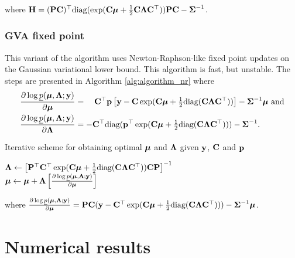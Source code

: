 \documentclass[times, doublespace]{anzsauth}
\begin{document}
	\noindent where ${\bf H} = ({\bf P} {\bf C})^\top \text{diag}(\exp({\bf C} {\boldsymbol \mu} + \tfrac{1}{2} {\bf C} {\boldsymbol \Lambda} {\bf C}^\top)) {\bf P} {\bf C} - {\boldsymbol \Sigma}^{-1}$.
	
	\subsubsection{GVA fixed point}
	
	
	This variant of the algorithm uses Newton-Raphson-like fixed point updates on the Gaussian variational lower
	bound. This algorithm is fast, but unstable. The steps are presented in Algorithm \ref{alg:algorithm_nr} where
	\begin{align*}
		\frac{\partial \log \underline{p}({\boldsymbol \mu}, {\boldsymbol \Lambda}; {\bf y})}{\partial {\boldsymbol\mu}}     & = \quad {\bf C}^\top{\bf p} \left [{\bf y} - {\bf C}\exp({\bf C} {\boldsymbol \mu} + \tfrac{1}{2} \text{diag}({\bf C} {\boldsymbol \Lambda} {\bf C}^\top)) \right ] - {\boldsymbol \Sigma}^{-1} {\boldsymbol \mu} \text{ and} \\
		\frac{\partial \log \underline{p}({\boldsymbol \mu}, {\boldsymbol \Lambda}; {\bf y})}{\partial {\boldsymbol\Lambda}} & = -{\bf C}^\top \text{diag}({\bf p}^\top \exp({\bf C} {\boldsymbol \mu} +\tfrac{1}{2} \text{diag}({\bf C} {\boldsymbol \Lambda} {\bf C}^\top))) - {\boldsymbol \Sigma}^{-1}.                             
	\end{align*}
	
	\begin{algorithm}
		\caption[Algorithm GVA NR]{Iterative scheme for obtaining optimal ${\boldsymbol \mu}$ and ${\boldsymbol \Lambda}$
			given ${\bf y}$, ${\bf C}$ and ${\bf p}$}
		\label{alg:algorithm_nr}
		\begin{algorithmic}
			\STATE ${\boldsymbol \Lambda} \leftarrow \left [ {\bf P}^\top {\bf C}^\top \exp({\bf C} {\boldsymbol \mu} + \tfrac{1}{2} \text{diag}({\bf C} {\boldsymbol \Lambda} {\bf C}^\top)) {\bf C} {\bf P} \right ]^{-1}$ \\ [1ex]
			\STATE ${\boldsymbol \mu} \leftarrow {\boldsymbol\mu} + {\boldsymbol \Lambda} \left [ \frac{\partial \log \underline{p}({\boldsymbol \mu}, {\boldsymbol \Lambda}; {\bf y})}{\partial {\boldsymbol\mu}} \right ]$
			\ENDWHILE
		\end{algorithmic}
		where $\frac{\partial \log \underline{p}({\boldsymbol \mu}, {\boldsymbol \Lambda}; {\bf y})}{\partial {\boldsymbol\mu}} = {\bf P} {\bf C} ({\bf y} - {\bf C}^\top \exp({\bf C} {\boldsymbol \mu} + \tfrac{1}{2} \text{diag}{({\bf C}{\boldsymbol\Lambda}{\bf C}^\top)})) - {\boldsymbol \Sigma}^{-1} {\boldsymbol \mu}$.
	\end{algorithm}
	
	
	\section{Numerical results}
	\label{sec:results}
	
\end{document}
